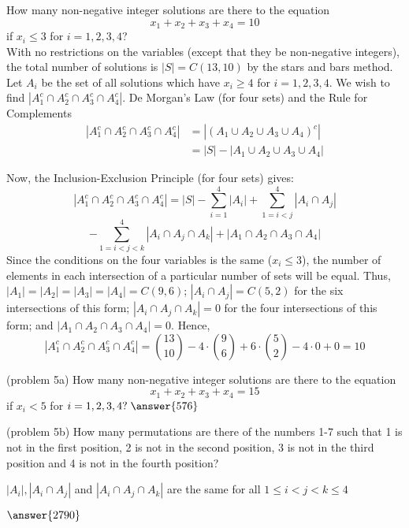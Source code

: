\documentclass[handout]{ximera}
\begin{document}
\begin{example}[example 5]
How many non-negative integer solutions are there to the equation
\[
x_1 + x_2 + x_3 + x_4  = 10
\]
if $x_i \leq 3$ for $i = 1, 2, 3, 4$?\\
With no restrictions on the variables (except that they be non-negative integers), 
the total number of solutions is $|S| = C(13, 10)$ by the stars and bars method.
Let $A_i$ be the set of all solutions which have $x_i \geq 4$ for $i = 1, 2, 3, 4$.
We wish to find $|A_1^c \cap A_2^c \cap A_3^c \cap A_4^c|$.
De Morgan's Law (for four sets) and the Rule for Complements 
\begin{align*}
|A_1^c \cap A_2^c \cap A_3^c \cap A_4^c| &= |(A_1 \cup A_2 \cup A_3 \cup A_4)^c|\\
               &= |S| - |A_1 \cup A_2 \cup A_3 \cup A_4|
\end{align*}               
   
Now, the Inclusion-Exclusion Principle (for four sets) gives:
\[
|A_1^c \cap A_2^c \cap A_3^c \cap A_4^c| = |S| - \sum_{i = 1}^4 |A_i| + \sum_{1 = i < j}^4 |A_i \cap A_j|
\]
\[
-\sum_{1 = i < j< k }^4 |A_i \cap A_j \cap A_k| + |A_1 \cap A_2 \cap A_3 \cap A_4 |
\]
Since the conditions on the four variables is the same ($x_i \leq 3$), 
the number of elements in each intersection of a particular number of sets will be equal.
Thus, $|A_1| = |A_2| =|A_3| =|A_4| = C(9,6)$; $|A_i \cap A_j| = C(5, 2)$ for the six intersections of this form;
$|A_i \cap A_j \cap A_k| = 0$ for the four intersections of this form; and $|A_1 \cap A_2 \cap A_3 \cap A_4| = 0$.
Hence,
\[
|A_1^c \cap A_2^c \cap A_3^c \cap A_4^c| = \binom{13}{10} - 4\cdot \binom{9}{6} + 6 \cdot \binom{5}{2} - 4 \cdot 0 + 0 = 10 
\]






\end{example}

\begin{problem}(problem 5a)
How many non-negative integer solutions are there to the equation
\[
x_1 + x_2 + x_3 + x_4 = 15
\]
if $x_i < 5$ for $i = 1, 2, 3, 4? \; \answer{576}$

\end{problem}



\begin{problem}(problem 5b)
How many permutations are there of the numbers 1-7 such that 1 is not in the first position, 2 is not in the 
second position, 3 is not in the third position and 4 is not in the fourth position?\\
\begin{hint}
$|A_i|, |A_i \cap A_j|$ and $|A_i \cap A_j \cap A_k|$ are the same for all $1 \leq i<j<k \leq 4$
\end{hint}
$\answer{2790}$
\end{problem}
\end{document}
